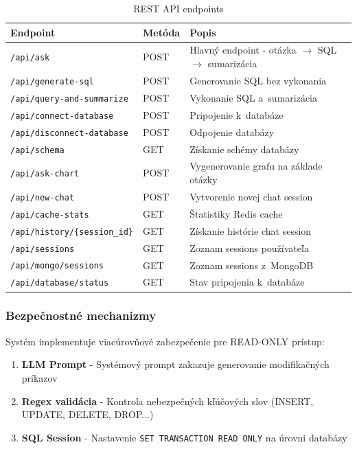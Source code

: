 \documentclass[a4paper, 12pt]{article}
\begin{document}
\begin{table}[H]
\centering
\begin{tabular}{llp{6cm}}
\toprule
\textbf{Endpoint} & \textbf{Metóda} & \textbf{Popis} \\
\midrule
\texttt{/api/ask} & POST & Hlavný endpoint - otázka $\rightarrow$ SQL $\rightarrow$ sumarizácia \\
\texttt{/api/generate-sql} & POST & Generovanie SQL bez vykonania \\
\texttt{/api/query-and-summarize} & POST & Vykonanie SQL a~sumarizácia \\
\texttt{/api/connect-database} & POST & Pripojenie k~databáze \\
\texttt{/api/disconnect-database} & POST & Odpojenie databázy \\
\texttt{/api/schema} & GET & Získanie schémy databázy \\
\texttt{/api/ask-chart} & POST & Vygenerovanie grafu na základe otázky \\
\texttt{/api/new-chat} & POST & Vytvorenie novej chat session \\
\texttt{/api/cache-stats} & GET & Štatistiky Redis cache \\
\texttt{/api/history/\{session\_id\}} & GET & Získanie histórie chat session \\
\texttt{/api/sessions} & GET & Zoznam sessions používateľa \\
\texttt{/api/mongo/sessions} & GET & Zoznam sessions z~MongoDB \\
\texttt{/api/database/status} & GET & Stav pripojenia k~databáze \\
\bottomrule
\end{tabular}
\caption{REST API endpoints}
\end{table}

\subsubsection{Bezpečnostné mechanizmy}

Systém implementuje viacúrovňové zabezpečenie pre READ-ONLY prístup:

\begin{enumerate}
    \item \textbf{LLM Prompt} - Systémový prompt zakazuje generovanie modifikačných príkazov
    \item \textbf{Regex validácia} - Kontrola nebezpečných kľúčových slov (INSERT, UPDATE, DELETE, DROP...)
    \item \textbf{SQL Session} - Nastavenie \texttt{SET TRANSACTION READ ONLY} na úrovni databázy
\end{enumerate}
\end{document}

